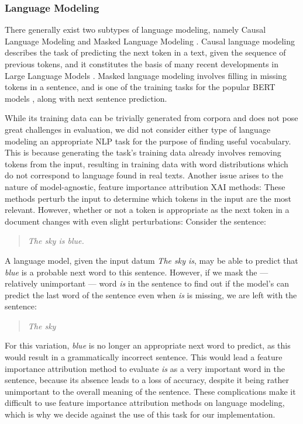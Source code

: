 \subsubsection{Language Modeling}
There generally exist two subtypes of language modeling, namely Causal Language Modeling and Masked Language Modeling \cite{jurafskySpeechLanguageProcessing2025a}.
Causal language modeling describes the task of predicting the next token in a text, given the sequence of previous tokens, and it constitutes the basis of many recent developments in Large Language Models \cite{brownLanguageModelsAre2020} \cite{openaiGPT4TechnicalReport2024}.
Masked language modeling involves filling in missing tokens in a sentence, and is one of the training tasks for the popular BERT models \cite{kentonBertPretrainingDeep2019}, along with next sentence prediction.

While its training data can be trivially generated from corpora and does not pose great challenges in evaluation, we did not consider either type of language modeling an appropriate NLP task for the purpose of finding useful vocabulary.
This is because generating the task's training data already involves removing tokens from the input, resulting in training data with word distributions which do not correspond to language found in real texts.
Another issue arises to the nature of model-agnostic, feature importance attribution XAI methods:
These methods perturb the input to determine which tokens in the input are the most relevant.
However, whether or not a token is appropriate as the next token in a document changes with even slight perturbations:
Consider the sentence:

\begin{quote}
	\textit{The sky is blue.}
\end{quote}

A language model, given the input datum \textit{The sky is}, may be able to predict that \textit{blue} is a probable next word to this sentence.
However, if we mask the --- relatively unimportant --- word  \textit{is} in the sentence to find out if the model's can predict the last word of the sentence even when \textit{is} is missing, we are left with the sentence:

\begin{quote}
	\textit{The sky}
\end{quote}

For this variation, \textit{blue} is no longer an appropriate next word to predict, as this would result in a grammatically incorrect sentence.
This would lead a feature importance attribution method to evaluate \textit{is} as a very important word in the sentence, because its absence leads to a loss of accuracy, despite it being rather unimportant to the overall meaning of the sentence.
These complications make it difficult to use feature importance attribution methods on language modeling, which is why we decide against the use of this task for our implementation.


